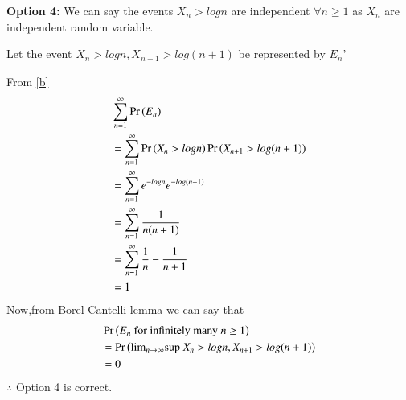\documentclass[journal,12pt,twocolumn]{IEEEtran}
\begin{document}
\vspace{0.5cm}\textbf{Option 4:} We can say the events $X_n>logn$ are independent $\forall n\geq 1$ as $X_n$ are independent random variable.

Let the event $X_n > logn,X_{n+1}>log(n+1)$ be represented by $E_n$'

From \eqref{b}
\begin{align}
    &\sum_{n=1}^{\infty}\Pr\left(E_n\right)\nonumber\\
    &= \sum_{n=1}^{\infty}\Pr\left(X_n>logn\right)\Pr\left(X_{n+1}>log(n+1)\right)\nonumber\\
    &=\sum_{n=1}^{\infty}e^{-logn}e^{-log(n+1)}\nonumber\\
    &=\sum_{n=1}^{\infty}\frac{1}{n(n+1)}\nonumber\\
    &=\sum_{n=1}^{\infty}\frac{1}{n}-\frac{1}{n+1}\nonumber\\
    &=1
\end{align}
Now,from Borel-Cantelli lemma we can say that
\begin{align}
    &\Pr\left(E_n\text{ for infinitely many }n\geq1\right)\nonumber\\
    &=\Pr\left(\text{lim}_{n \rightarrow \infty}\text{sup }X_n>logn,X_{n+1}>log(n+1)\right)\nonumber\\
    &=0\nonumber
\end{align}
$\therefore$ Option 4 is correct.

\vspace{0.5cm}\centering {}
\end{document}
